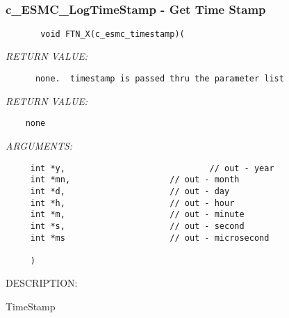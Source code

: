  
\mbox{}\hrulefill\ 
 
\subsubsection [c\_ESMC\_LogTimeStamp] {c\_ESMC\_LogTimeStamp - Get Time Stamp}


  
\begin{verbatim}       void FTN_X(c_esmc_timestamp)(\end{verbatim}{\em RETURN VALUE:}
\begin{verbatim}      none.  timestamp is passed thru the parameter list\end{verbatim}{\em RETURN VALUE:}
\begin{verbatim}    none\end{verbatim}{\em ARGUMENTS:}
\begin{verbatim}     int *y,                             // out - year
     int *mn,                    // out - month
     int *d,                     // out - day
     int *h,                     // out - hour
     int *m,                     // out - minute
     int *s,                     // out - second
     int *ms                     // out - microsecond
 
     )\end{verbatim}
{\sf DESCRIPTION:\\ }


   TimeStamp
\setlength{\parskip}{\oldparskip}
\setlength{\parindent}{\oldparindent}
\setlength{\baselineskip}{\oldbaselineskip}
